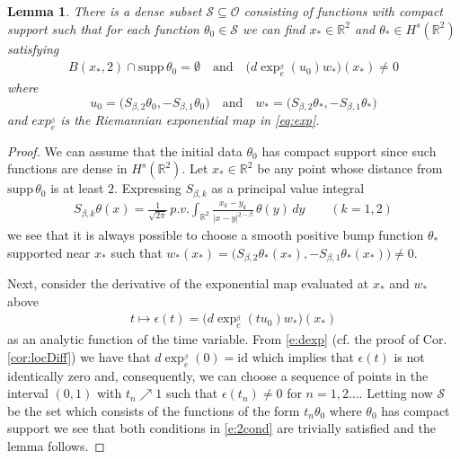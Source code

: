 \documentclass[11pt]{amsart}
\numberwithin{equation}{section}
\newtheorem{lemma}[theorem]{Lemma}
\begin{document}
% 
\begin{lemma} \label{lemma_dense} 
There is a dense subset 
$\mathcal{S} \subseteq \mathcal{O}$ 
consisting of functions with compact support 
such that for each function 
$\theta_0 \in \mathcal{S}$ 
we can find $x_{*} \in \mathbb R^2$ 
and $\theta_{*} \in H^s(\mathbb R^2)$ 
satisfying 
% 
\begin{align}\label{e:2cond} 
B(x_*,2)\cap \mathrm{supp}\, \theta_0 = \emptyset	
\quad \text{and} \quad 	
\big( d\exp_{e}^{_{\beta}}(u_0)w_{*}\big)(x_*)\neq 0
\end{align}
%	
where 
$$
u_0 
= 
\Big(S_{\beta,2}\theta_0,-S_{\beta,1}\theta_0\Big) 
\quad \text{and}\quad 
w_{*}=\Big(S_{\beta,2}\theta_*,-S_{\beta,1}\theta_*\Big) 
$$ 
and $exp_{e}^{_{\beta}}$ is the Riemannian exponential map in \eqref{eq:exp}. 
\end{lemma}
% 
\begin{proof} 
We can assume that the initial data $\theta_0$ 
has compact support since such functions are dense 
in $H^s(\mathbb{R}^2)$. 
Let $x_\ast \in \mathbb{R}^2$ be any point whose distance 
from $\mathrm{supp}\, \theta_0$ is at least $2$. 
Expressing $S_{\beta,k}$ as a principal value integral 
% 
\begin{align*}
S_{\beta,k} \theta(x) 
= 
\frac{1}{\sqrt{2\pi}} 
\, p.v. \int_{\mathbb R^2} 
\frac{x_k - y_k}{|x-y|^{2-\beta}}\,\theta(y) \, dy 
\qquad (k=1,2) 
\end{align*} 
% 
we see that it is always possible to choose 
a smooth positive bump function $\theta_\ast$ 
supported near $x_\ast$ such that 
$w_\ast(x_*) 
=  
\big( 
S_{\beta,2}\theta_\ast (x_\ast),-S_{\beta,1}\theta_\ast (x_\ast) 
\big) 
\ne 0$.

Next, consider the derivative of the exponential map 
evaluated at $x_\ast$ and $w_\ast$ above 
% 
\begin{align}\label{e:diff_exp}
t \mapsto \epsilon (t) 
= 
\big( d \exp_{e}^{_{\beta}} (tu_0)w_\ast \big)(x_*)
\end{align}
% 
as an analytic function of the time variable. 
From \eqref{e:dexp} 
(cf. the  proof of Cor. \ref{cor:locDiff}) 
we have that $d \exp_{e}^{_{\beta}} (0)= \mathrm{id}$ 
which implies that $\epsilon (t)$ is not identically zero 
and, consequently, we can choose a sequence of points 
in the interval $(0,1)$ with $t_n \nearrow 1$ 
such that 
$\epsilon(t_n) \neq 0$ for $n=1, 2 \dots$. 
Letting now $\mathcal{S}$ be the set which consists of 
the functions 
of the form $t_n \theta_0$ where $\theta_0$ has compact support we see that both conditions in \eqref{e:2cond} are trivially satisfied and the lemma follows.    
\end{proof}
% 
\end{document}
